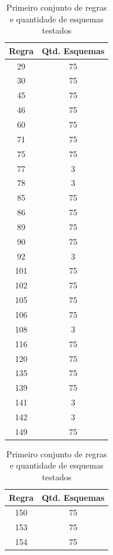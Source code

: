 \documentclass[a4paper,12pt]{ltxdoc}
\begin{document}
\setlength{\aboverulesep}{0pt}
\setlength{\belowrulesep}{0pt}
\begin{table}[H]
  \caption{Primeiro conjunto de regras e quantidade de esquemas testados}
  \begin{minipage}{.4\textwidth}
    \centering
    \begin{tabular}{| c | c |}
      \hline Regra & Qtd. Esquemas\\\hline
  29 & 75  \\ \hline
  30 & 75  \\ \hline
  45 & 75  \\ \hline
  46 & 75  \\ \hline
  60 & 75  \\ \hline
  71 & 75  \\ \hline
  75 & 75  \\ \hline
  77 & 3   \\ \hline
  78 & 3   \\ \hline
  85 & 75  \\ \hline
  86 & 75  \\ \hline
  89 & 75  \\ \hline
  90 & 75  \\ \hline
  92 & 3   \\ \hline
  101 & 75 \\ \hline
  102 & 75 \\ \hline
  105 & 75 \\ \hline
  106 & 75 \\ \hline
  108 & 3  \\ \hline
  116 & 75 \\ \hline
  120 & 75 \\ \hline
  135 & 75 \\ \hline
  139 & 75 \\ \hline
  141 & 3  \\ \hline
  142 & 3  \\ \hline
  149 & 75 \\ \hline
  \hline
    \end{tabular}
  \end{minipage}
  \begin{minipage}{.4\textwidth}
    \centering
    \begin{tabular}{ | c | c | }
    \hline
      \hline Regra & Qtd. Esquemas\\
      \midrule 
  150 & 75 \\ \hline
  153 & 75 \\ \hline
  154 & 75 \\ \hline

\end{tabular}
\end{minipage}
\end{table}
\end{document}

